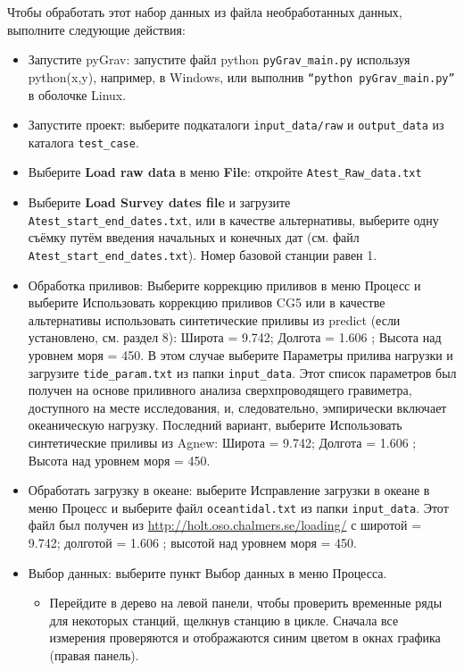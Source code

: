 Чтобы обработать этот набор данных из файла необработанных данных, выполните
следующие действия:
\begin{itemize}
    \item Запустите pyGrav: запустите файл python \verb|pyGrav_main.py| используя
    python(x,y), например, в Windows, или выполнив \verb|“python pyGrav_main.py”| в
    оболочке Linux.

    \item Запустите проект: выберите подкаталоги \verb|input_data/raw| и \verb|output_data| из
    каталога \verb|test_case|.

    \item Выберите \textbf{Load raw data} в меню \textbf{File}: откройте \verb|Atest_Raw_data.txt|

    \item Выберите \textbf{Load Survey dates file} и загрузите
    \verb|Atest_start_end_dates.txt|, или в качестве альтернативы, выберите одну
    съёмку путём введения начальных и конечных дат (см. файл
    \verb|Atest_start_end_dates.txt|). Номер базовой станции равен 1.

    \item Обработка приливов: Выберите коррекцию приливов в меню Процесс и
    выберите Использовать коррекцию приливов CG5 или в качестве альтернативы
    использовать синтетические приливы из predict (если установлено, см. раздел
    8): Широта = 9.742; Долгота = 1.606 ; Высота над уровнем моря = 450. В этом
    случае выберите Параметры прилива нагрузки и загрузите \verb|tide_param.txt| из
    папки \verb|input_data|. Этот список параметров был получен на основе приливного
    анализа сверхпроводящего гравиметра, доступного на месте исследования, и,
    следовательно, эмпирически включает океаническую нагрузку. Последний
    вариант, выберите Использовать синтетические приливы из Agnew: Широта =
    9.742; Долгота = 1.606 ; Высота над уровнем моря = 450.

    \item Обработать загрузку в океане: выберите Исправление загрузки в океане в
    меню Процесс и выберите файл \verb|oceantidal.txt| из папки \verb|input_data|. Этот файл
    был получен из \url{http://holt.oso.chalmers.se/loading/} с широтой = 9.742;
    долготой = 1.606 ; высотой над уровнем моря = 450.

    \item Выбор данных: выберите пункт Выбор данных в меню Процесса.
    \begin{itemize}
        \item Перейдите в дерево на левой панели, чтобы проверить временные ряды
        для некоторых станций, щелкнув станцию в цикле. Сначала все измерения
        проверяются и отображаются синим цветом в окнах графика (правая панель).
        

\end{itemize}
\end{itemize}
